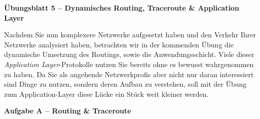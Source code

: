 \documentclass[paper=a4,fontsize=11pt]{scrartcl}%
\numberwithin{equation}{section}
\begin{document}
\begin{center}
\Large{\textbf{Übungsblatt 5 -- Dynamisches Routing, Traceroute \& Application Layer}}
\end{center}
Nachdem Sie nun komplexere Netzwerke aufgesetzt haben und den Verkehr Ihrer Netzwerke analysiert haben, betrachten wir in der kommenden Übung die dynamische Umsetzung des Routings, sowie die Anwendungsschicht. Viele dieser \emph{Application Layer}-Protokolle nutzen Sie bereits ohne es bewusst wahrgenommen zu haben. Da Sie als angehende Netzwerkprofis aber nicht nur daran interessiert sind Dinge zu nutzen, sondern deren Aufbau zu verstehen, soll mit der Übung zum Application-Layer diese Lücke ein Stück weit kleiner werden.

\begin{center}\Large{\textbf{Aufgabe A -- Routing \& Traceroute}}\end{center}\vskip0.2in
\end{document}
